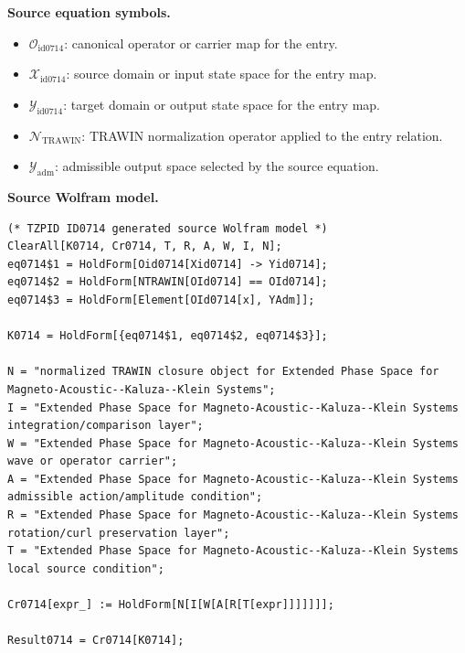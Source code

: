 \begin{minipage}[t]{0.49\linewidth}
\begingroup
\small
\raggedright
\textbf{Source equation symbols.}\par
\begin{itemize}[leftmargin=1.35em,itemsep=1pt,topsep=1pt,parsep=0pt]
    \item $\mathcal{O}_{\mathrm{id0714}}$: canonical operator or carrier map for the entry.
    \item $\mathcal{X}_{\mathrm{id0714}}$: source domain or input state space for the entry map.
    \item $\mathcal{Y}_{\mathrm{id0714}}$: target domain or output state space for the entry map.
    \item $\mathcal{N}_{\mathrm{TRAWIN}}$: TRAWIN normalization operator applied to the entry relation.
    \item $\mathcal{Y}_{\mathrm{adm}}$: admissible output space selected by the source equation.
\end{itemize}
\endgroup
\end{minipage}\hfill
\begin{minipage}[t]{0.47\linewidth}
\begingroup
\scriptsize
\raggedright
\textbf{Source Wolfram model.}\par
\begin{Verbatim}[fontsize=\tiny,breaklines=true,breakanywhere=true]
(* TZPID ID0714 generated source Wolfram model *)
ClearAll[K0714, Cr0714, T, R, A, W, I, N];
eq0714$1 = HoldForm[Oid0714[Xid0714] -> Yid0714];
eq0714$2 = HoldForm[NTRAWIN[OId0714] == OId0714];
eq0714$3 = HoldForm[Element[OId0714[x], YAdm]];

K0714 = HoldForm[{eq0714$1, eq0714$2, eq0714$3}];

N = "normalized TRAWIN closure object for Extended Phase Space for Magneto-Acoustic--Kaluza--Klein Systems";
I = "Extended Phase Space for Magneto-Acoustic--Kaluza--Klein Systems integration/comparison layer";
W = "Extended Phase Space for Magneto-Acoustic--Kaluza--Klein Systems wave or operator carrier";
A = "Extended Phase Space for Magneto-Acoustic--Kaluza--Klein Systems admissible action/amplitude condition";
R = "Extended Phase Space for Magneto-Acoustic--Kaluza--Klein Systems rotation/curl preservation layer";
T = "Extended Phase Space for Magneto-Acoustic--Kaluza--Klein Systems local source condition";

Cr0714[expr_] := HoldForm[N[I[W[A[R[T[expr]]]]]]];

Result0714 = Cr0714[K0714];
\end{Verbatim}
\endgroup
\end{minipage}

